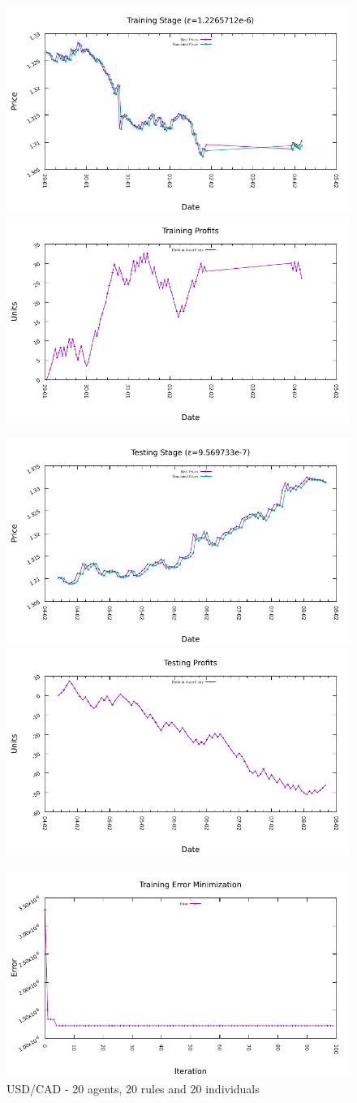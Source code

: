 \begin{figure}[htp]
  \centering

  \includegraphics[width=.45\textwidth]{img/plots/usd_cad_h1-20agents-20rules-20ind-100gen_training_fit.pdf}\quad
  \includegraphics[width=.45\textwidth]{img/plots/usd_cad_h1-20agents-20rules-20ind-100gen_training_profits.pdf}

  \medskip

  \includegraphics[width=.45\textwidth]{img/plots/usd_cad_h1-20agents-20rules-20ind-100gen_testing_fit.pdf}\quad
  \includegraphics[width=.45\textwidth]{img/plots/usd_cad_h1-20agents-20rules-20ind-100gen_testing_profits.pdf}

  \medskip

  \includegraphics[width=.45\textwidth]{img/plots/usd_cad_h1-20agents-20rules-20ind-100gen_error_minimization.pdf}

  \caption{USD/CAD - 20 agents, 20 rules and 20 individuals}
  \label{figure:usd-cad-20agents-20rules-20individuals}
\end{figure}



